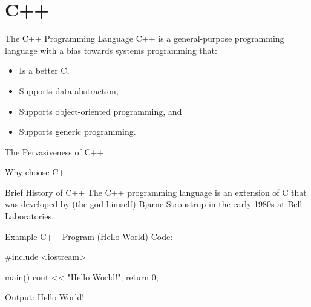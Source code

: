 \documentclass[../lecture1-introduction.tex]{subfiles}
\begin{document}
\section{C++}


\begin{frame}[fragile]{The C++ Programming Language}
    C++ is a general-purpose programming language with a bias towards systems
    programming that:
    \begin{itemize}
        \item Is a better C,
        \item Supports data abstraction,
        \item Supports object-oriented programming, and
        \item Supports generic programming.
    \end{itemize}
\end{frame}


\begin{frame}[fragile]{The Pervasiveness of C++}



\end{frame}


\begin{frame}[fragile]{Why choose C++}



\end{frame}


\begin{frame}[fragile]{Brief History of C++}
    The C++ programming language is an extension of C that was developed by
    (the god himself) Bjarne Stroustrup in the early 1980s at Bell Laboratories.
\end{frame}


\begin{frame}[fragile]{Example C++ Program (Hello World)}
    Code:
    \begin{cppcode}
        #include <iostream>

        main()
        {
            cout << "Hello World!";
            return 0;
        }
    \end{cppcode}
    Output:
        Hello World!
\end{frame}

\end{document}
